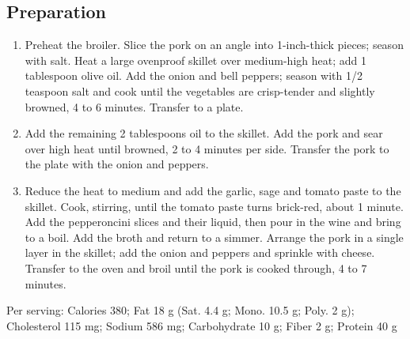 \subsection{Preparation}
\begin{enumerate}
    \item Preheat the broiler. Slice the pork on an angle into 1-inch-thick pieces; season with salt. Heat a large ovenproof skillet over medium-high heat; add 1 tablespoon olive oil. Add the onion and bell peppers; season with 1/2 teaspoon salt and cook until the vegetables are crisp-tender and slightly browned, 4 to 6 minutes. Transfer to a plate.
    \item Add the remaining 2 tablespoons oil to the skillet. Add the pork and sear over high heat until browned, 2 to 4 minutes per side. Transfer the pork to the plate with the onion and peppers.
    \item Reduce the heat to medium and add the garlic, sage and tomato paste to the skillet. Cook, stirring, until the tomato paste turns brick-red, about 1 minute. Add the pepperoncini slices and their liquid, then pour in the wine and bring to a boil. Add the broth and return to a simmer. Arrange the pork in a single layer in the skillet; add the onion and peppers and sprinkle with cheese. Transfer to the oven and broil until the pork is cooked through, 4 to 7 minutes.
\end{enumerate}

Per serving: Calories 380; Fat 18 g (Sat. 4.4 g; Mono. 10.5 g; Poly. 2 g); Cholesterol 115 mg; Sodium 586 mg; Carbohydrate 10 g; Fiber 2 g; Protein 40 g
